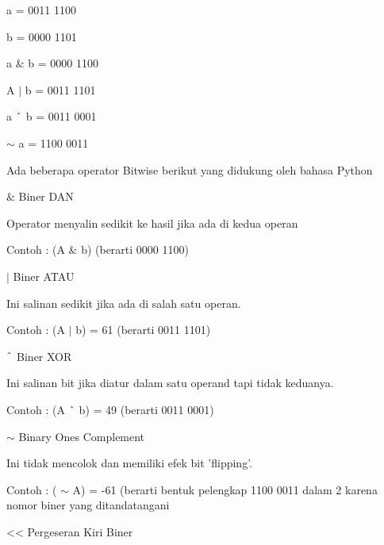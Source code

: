 \vspace{12pt}
\noindent 
a = 0011 1100 \par
\vspace{12pt}
\noindent 
b = 0000 1101 \par
\vspace{12pt}
\vspace{12pt}
\noindent 
a  $  \&  $ b = 0000 1100 \par
\vspace{12pt}
\noindent 
A  $  \vert  $ b = 0011 1101 \par
\vspace{12pt}
\noindent 
a  $  \string^  $ b = 0011 0001 \par
\vspace{12pt}
\noindent 
 $  \sim  $ a = 1100 0011 \par
\vspace{12pt}
\noindent 
Ada beberapa operator Bitwise berikut yang didukung oleh bahasa Python \par
\vspace{12pt}
\noindent 
 $  \&  $ Biner DAN \par
\noindent 
Operator menyalin sedikit ke hasil jika ada di kedua operan \par
\noindent 
Contoh : (A  $  \&  $ b) (berarti 0000 1100) \par
\vspace{12pt}
\noindent 
 $  \vert  $ $  $Biner ATAU \par
\noindent 
Ini salinan sedikit jika ada di salah satu operan. \par
\noindent 
Contoh : (A  $  \vert  $ b) = 61 (berarti 0011 1101) \par
\vspace{12pt}
\noindent 
 $  \string^  $ Biner XOR \par
\noindent 
Ini salinan bit jika diatur dalam satu operand tapi tidak keduanya. \par
\noindent 
Contoh : (A  $  \string^  $ b) = 49 (berarti 0011 0001) \par
\vspace{12pt}
\noindent 
 $  \sim  $ Binary Ones Complement \par
\noindent 
Ini tidak mencolok dan memiliki efek bit 'flipping'. \par
\noindent 
Contoh : ( $  \sim  $ A) = -61 (berarti bentuk pelengkap 1100 0011 dalam 2 karena nomor biner yang ditandatangani \par
\vspace{12pt}
\noindent 
<< Pergeseran Kiri Biner \par
